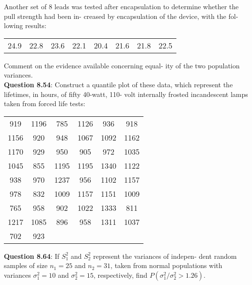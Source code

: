 \documentclass{article}
\begin{document}
    Another set of 8 leads was tested after encapsulation
    to determine whether the pull strength had been in-
    creased by encapsulation of the device, with the fol-
    lowing results:
        \begin{center}
            \begin{tabular}{c c c c c c c c}
                24.9 & 22.8 & 23.6 & 22.1 & 20.4 & 21.6 & 21.8 & 22.5
            \end{tabular}
        \end{center}
    Comment on the evidence available concerning equal-
    ity of the two population variances.\\\newline
    \textbf{Question 8.54}: Construct a quantile plot of these data, which
    represent the lifetimes, in hours, of fifty 40-watt, 110-
    volt internally frosted incandescent lamps taken from
    forced life tests:
        \begin{center}
            \begin{tabular}{c c c c c c}
                919 & 1196 & 785 & 1126 & 936 & 918 \\
                1156 & 920 & 948 & 1067 & 1092 & 1162 \\
                1170 & 929 & 950 & 905 & 972 & 1035 \\
                1045 & 855 & 1195 & 1195 & 1340 & 1122 \\
                938 & 970 & 1237 & 956  & 1102 & 1157 \\
                978 & 832 & 1009 & 1157 & 1151 & 1009 \\
                765 & 958 & 902 & 1022 & 1333 & 811 \\ 
                1217 & 1085 & 896 & 958 & 1311 & 1037 \\
                702 & 923
            \end{tabular}
        \end{center}
    \textbf{Question 8.64}: If $S^2_1$ and $S_2^2$ represent the variances of indepen-
    dent random samples of size $n_1 = 25$ and $n_2 = 31$,
    taken from normal populations with variances $\sigma^2_1 = 10$
    and $\sigma_2^2 = 15$, respectively, find $P(\sigma^2_1 / \sigma_2^2 > 1.26)$.
\end{document}
